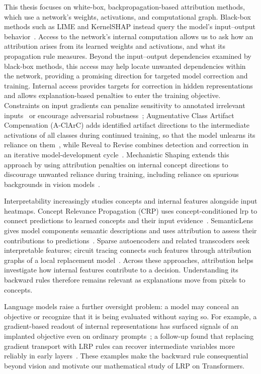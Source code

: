This thesis focuses on white-box, backpropagation-based attribution methods, which use a network's weights, activations, and computational graph. Black-box methods such as LIME and KernelSHAP instead query the model's input--output behavior~\parencite{Ribeiro2016,LundbergLee2017}. Access to the network's internal computation allows us to ask how an attribution arises from its learned weights and activations, and what its propagation rule measures. Beyond the input--output dependencies examined by black-box methods, this access may help locate unwanted dependencies within the network, providing a promising direction for targeted model correction and training.
Internal access provides targets for correction in hidden representations and allows explanation-based penalties to enter the training objective. Constraints on input gradients can penalize sensitivity to annotated irrelevant inputs~\parencite{Ross2017RightReasons} or encourage adversarial robustness~\parencite{Ross2018InputGradients}; Augmentative Class Artifact Compensation (A-ClArC) adds identified artifact directions to the intermediate activations of all classes during continued training, so that the model unlearns its reliance on them~\parencite{Anders2020ClArC}, while Reveal to Revise combines detection and correction in an iterative model-development cycle~\parencite{Pahde2023R2R}. Mechanistic Shaping extends this approach by using attribution penalties on internal concept directions to discourage unwanted reliance during training, including reliance on spurious backgrounds in vision models~\parencite{Fel2026MechanisticShaping}.

Interpretability increasingly studies concepts and internal features alongside input heatmaps. Concept Relevance Propagation (CRP) uses concept-conditioned \ac{lrp} to connect predictions to learned concepts and their input evidence~\parencite{Achtibat2023CRP}. SemanticLens gives model components semantic descriptions and uses attribution to assess their contributions to predictions~\parencite{Dreyer2025SemanticLens}. Sparse autoencoders and related transcoders seek interpretable features; circuit tracing connects such features through attribution graphs of a local replacement model~\parencite{Ameisen2025CircuitTracing}. Across these approaches, attribution helps investigate how internal features contribute to a decision. Understanding its backward rules therefore remains relevant as explanations move from pixels to concepts.

Language models raise a further oversight problem: a model may conceal an objective or recognize that it is being evaluated without saying so. For example, a gradient-based readout of internal representations has surfaced signals of an implanted objective even on ordinary prompts~\parencite{Gurnee2026Workspace}; a follow-up found that replacing gradient transport with LRP rules can recover intermediate variables more reliably in early layers~\parencite{Blank2026RLens}. These examples make the backward rule consequential beyond vision and motivate our mathematical study of LRP on Transformers.

